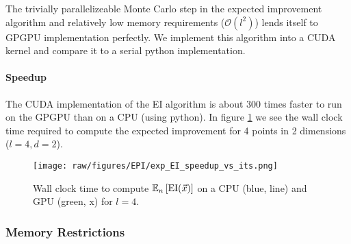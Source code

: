 The trivially parallelizeable Monte Carlo step in the expected improvement algorithm and relatively low memory requirements ($\mathcal{O}(l^{2})$) lends itself to GPGPU implementation perfectly. We implement this algorithm into a CUDA kernel and compare it to a serial python implementation.

%
%

\paragraph{Speedup}

The CUDA implementation of the EI algorithm is about 300 times faster to run on the GPGPU than on a CPU (using python). In figure \ref{GPUspeed1} we see the wall clock time required to compute the expected improvement for 4 points in 2 dimensions ($l=4, d=2$).

 \begin{figure}[hpt]
 	\centerline{\texttt{[image: raw/figures/EPI/exp\_EI\_speedup\_vs\_its.png]}}
    \caption[CPU vs GPU time to compute EI]{Wall clock time to compute $\mathbb{E}_{n}\left[{\rm EI}(\vec{x})\right]$ on a CPU (blue, line) and GPU (green, x) for $l = 4$.}
 	\label{GPUspeed1}
 \end{figure}

%
%

\subsubsection{Memory Restrictions} %
\label{sub:Memory Restrictions}

